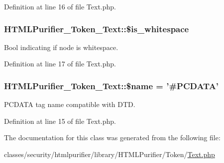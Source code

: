 Definition at line 16 of file Text.\+php.

\hypertarget{classHTMLPurifier__Token__Text_aabc9a269015ae9b3e370a15ee5de621f}{
\subsubsection[{\$is\+\_\+whitespace}]{\setlength{\rightskip}{0pt plus 5cm}H\+T\+M\+L\+Purifier\+\_\+\+Token\+\_\+\+Text\+::\$is\+\_\+whitespace}}\label{classHTMLPurifier__Token__Text_aabc9a269015ae9b3e370a15ee5de621f}
Bool indicating if node is whitespace. 

Definition at line 17 of file Text.\+php.

\hypertarget{classHTMLPurifier__Token__Text_a2e1a60c76a85960d81f9e74f2fd2f294}{
\subsubsection[{\$name}]{\setlength{\rightskip}{0pt plus 5cm}H\+T\+M\+L\+Purifier\+\_\+\+Token\+\_\+\+Text\+::\$name = '\#P\+C\+D\+A\+T\+A'}}\label{classHTMLPurifier__Token__Text_a2e1a60c76a85960d81f9e74f2fd2f294}
P\+C\+D\+A\+T\+A tag name compatible with D\+T\+D. 

Definition at line 15 of file Text.\+php.



The documentation for this class was generated from the following file\+:\begin{DoxyCompactItemize}
\item 
classes/security/htmlpurifier/library/\+H\+T\+M\+L\+Purifier/\+Token/\hyperlink{Token_2Text_8php}{Text.\+php}\end{DoxyCompactItemize}
